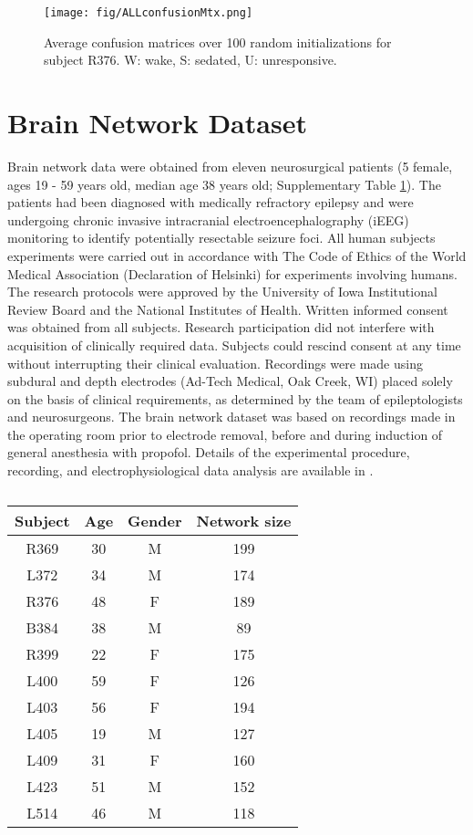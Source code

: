 \documentclass{article} %
\begin{document}
\begin{figure}
\centering
\texttt{[image: fig/ALLconfusionMtx.png]}
\caption{Average confusion matrices over 100 random initializations for subject R376. W: wake, S: sedated, U: unresponsive.}
\label{suppfig:confusion}
\end{figure}



\section{Brain Network Dataset}
\label{supp:brain}

Brain network data were obtained from eleven neurosurgical patients (5 female, ages 19 - 59 years old, median age 38 years old; Supplementary Table \ref{supptab:dataset}). The patients had been diagnosed with medically refractory epilepsy and were undergoing chronic invasive intracranial electroencephalography (iEEG) monitoring to identify potentially resectable seizure foci. All human subjects experiments were carried out in accordance with The Code of Ethics of the World Medical Association (Declaration of Helsinki) for experiments involving humans. The research protocols were approved by the University of Iowa Institutional Review Board and the National Institutes of Health. Written informed consent was obtained from all subjects. Research participation did not interfere with acquisition of clinically required data. Subjects could rescind consent at any time without interrupting their clinical evaluation. Recordings were made using subdural and depth electrodes (Ad-Tech Medical, Oak Creek, WI) placed solely on the basis of clinical requirements, as determined by the team of epileptologists and neurosurgeons. The brain network dataset was based on recordings made in the operating room prior to electrode removal, before and during induction of general anesthesia with propofol. Details of the experimental procedure, recording, and electrophysiological data analysis are available in \citep{banks2020cortical}.


\begin{table}[t]
\caption{}
\label{supptab:dataset}
\centering
\begin{tabular}{cccc}
        Subject & Age & Gender & Network size  \\
    \midrule
    R369 & 30 & M & 199 \\
    L372 & 34 & M & 174 \\
    R376 & 48 & F & 189 \\
    B384 & 38 & M & 89 \\
    R399 & 22 & F & 175 \\
    L400 & 59 & F & 126 \\
    L403 & 56 & F & 194 \\
    L405 & 19 & M & 127 \\
    L409 & 31 & F & 160 \\
    L423 & 51 & M & 152 \\
    L514 & 46 & M & 118 \\
    \bottomrule
\end{tabular}
\end{table}
\end{document}
